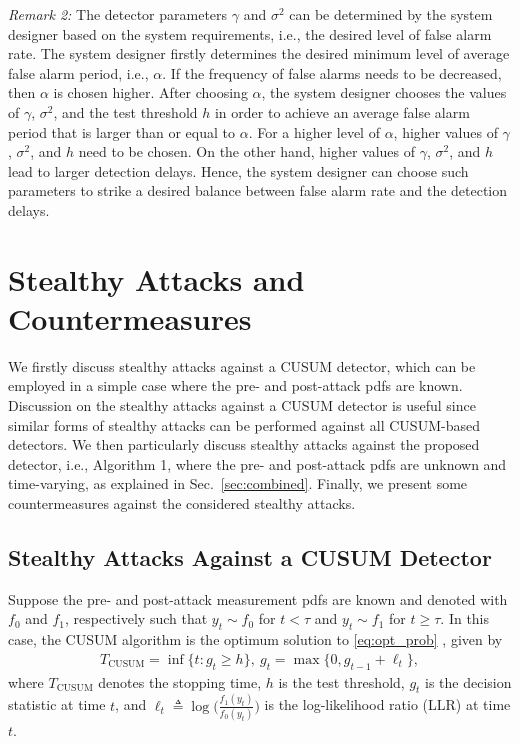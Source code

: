 \documentclass[onecolumn]{IEEEtran}
\def\inf{\mathop{\mathrm{inf}}}
\begin{document}
\textit{Remark 2:} The detector parameters $\gamma$ and $\sigma^2$ can be determined by the system designer based on the system requirements, i.e., the desired level of false alarm rate. The system designer firstly determines the desired minimum level of average false alarm period, i.e., $\alpha$. If the frequency of false alarms needs to be decreased, then $\alpha$ is chosen higher. After choosing $\alpha$, the system designer chooses the values of $\gamma$, $\sigma^2$, and the test threshold $h$ in order to achieve an average false alarm period that is larger than or equal to $\alpha$. For a higher level of $\alpha$, higher values of $\gamma$, $\sigma^2$, and $h$ need to be chosen. On the other hand, higher values of $\gamma$, $\sigma^2$, and $h$ lead to larger detection delays. Hence, the system designer can choose such parameters to strike a desired balance between false alarm rate and the detection delays.


\section{Stealthy Attacks and Countermeasures} \label{sec:stealth}


We firstly discuss stealthy attacks against a CUSUM detector, which can be employed in a simple case where the pre- and post-attack pdfs are known. Discussion on the stealthy attacks against a CUSUM detector is useful since similar forms of stealthy attacks can be performed against all CUSUM-based detectors. We then particularly discuss stealthy attacks against the proposed detector, i.e., Algorithm 1, where the pre- and post-attack pdfs are unknown and time-varying, as explained in Sec.~\ref{sec:combined}. Finally, we present some countermeasures against the considered stealthy attacks.

\subsection{Stealthy Attacks Against a CUSUM Detector} \label{sec:st_cusum}

Suppose the pre- and post-attack measurement pdfs are known and denoted with $f_0$ and $f_1$, respectively such that $y_t \sim f_0$ for $t < \tau$ and $y_t \sim f_1$ for $t \geq \tau$. In this case, the CUSUM algorithm is the optimum solution to \eqref{eq:opt_prob} \cite{Moustakides_86}, given by
\begin{gather}\label{eq:cusum}
T_{\text{CUSUM}} = \inf\{t: g_t \geq h\}, ~ g_t = \max\{0, g_{t-1} + \ell_t\},
\end{gather}
where $T_{\text{CUSUM}}$ denotes the stopping time, $h$ is the test threshold, $g_t$ is the decision statistic at time $t$, and $\ell_t \triangleq \log\big(\frac{f_1(y_t)}{f_0(y_t)}\big)$ is the log-likelihood ratio (LLR) at time $t$.
\end{document}
